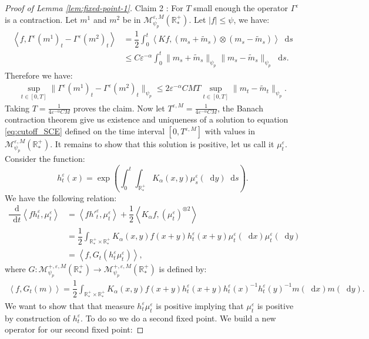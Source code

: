 \documentclass[11pt,a4paper]{article}
\newcommand{\RRP}{\mathbb{R}^+_*}
\newcommand{\MC}{\mathcal{M}}
\newcommand{\brac}[1]{\left\langle#1\right\rangle}
\newcommand{\dd}{\mathop{}\!\mathrm{d}}
\begin{document}
\begin{proof}[Proof of Lemma \ref{lem:fixed-point-1}]
    Claim 2 : For $T$ small enough the operator $\Gamma^\varepsilon$ is a contraction. Let $m^1$ and $m^2$ be in $\MC^{\varepsilon,M}_{\psi_p}\left(\RRP\right)$. Let $|f| \leq \psi$, we have:
    \begin{align*}
        \brac{f,\Gamma^\varepsilon(m^1)_t - \Gamma^\varepsilon(m^2)_t}
        &= \dfrac{1}{2}\int_0^t \brac{Kf,\left(m_s + \tilde{m}_s\right)\otimes\left( m_s - \tilde{m}_s\right)} \dd s \\
        &\leq C\varepsilon^{-\alpha}\int_0^t \|m_s + \tilde{m}_s\|_{\psi_p} \|m_s - \tilde{m}_s\|_{\psi_p}\dd s .
    \end{align*}
    Therefore we have:
    \begin{align*}
        \sup\limits_{t \in [0,T]} \|\Gamma^\varepsilon(m^1)_t - \Gamma^\varepsilon(m^2)_t\|_{\psi_p} \leq 2\varepsilon^{-\alpha} CMT\sup\limits_{t \in [0,T]} \|m_t - \tilde{m}_t\|_{\psi_p} .
    \end{align*}
    Taking $T = \frac{1}{4\varepsilon^{-\alpha}CM}$ proves the claim. Now let $T^{\varepsilon,M} = \frac{1}{4\varepsilon^{-\alpha}CM}$, the Banach contraction theorem give us existence and uniqueness of a solution to equation \eqref{eq:cutoff_SCE} defined on the time interval $[0,T^{\varepsilon,M}]$ with values in $\MC^{\varepsilon,M}_{\psi_p}\left(\RRP\right)$. It remains to show that this solution is positive, let us call it $\mu_t^\varepsilon$. Consider the function:
    \[
    h^\varepsilon_t(x) = \exp\left(\int_0^t\int_{\RRP}K_\alpha (x,y) \mu^\varepsilon_s(\dd y) \dd s\right).
    \]
    We have the following relation:
    \begin{align*}
        \dfrac{\dd}{\dd t}\brac{fh^\varepsilon_t,\mu^\varepsilon_t} &= \brac{fh'^{\varepsilon}_t,\mu^\varepsilon_t} + \dfrac{1}{2}\brac{K_\alpha f,\left(\mu^\varepsilon_t\right)^{\otimes 2}}\\
        &= \dfrac{1}{2}\int_{\RRP\times\RRP} K_\alpha(x,y) f(x+y)h^\varepsilon_t(x+y)\mu^\varepsilon_t(\dd x)\mu^\varepsilon_t(\dd y) \\
        &= \brac{f,G_t(h^\varepsilon_t\mu^\varepsilon_t)},
    \end{align*}
    where $G : \MC^{+,\varepsilon,M}_{\psi_p}(\RRP) \to \MC^{+,\varepsilon,M}_{\psi_p}(\RRP)$ is defined by:
    \begin{align*}
        \brac{f,G_t(m)} =  \dfrac{1}{2}\int_{\RRP\times\RRP} K_\alpha(x,y) f(x+y)h^\varepsilon_t(x+y) h^\varepsilon_t(x)^{-1} h^\varepsilon_t(y)^{-1}m(\dd x)m(\dd y).
    \end{align*}
    We want to show that that measure $h^\varepsilon_t\mu^\varepsilon_t$ is positive implying that $\mu^\varepsilon_t$ is positive by construction of $h^\varepsilon_t$. To do so we do a second fixed point. We build a new operator for our second fixed point: 

\end{proof}
\end{document}
